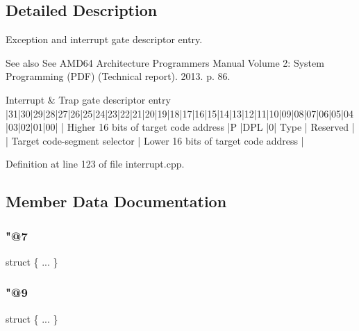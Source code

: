 \subsection{Detailed Description}
Exception and interrupt gate descriptor entry. 

\begin{DoxySeeAlso}{See also}
See A\+M\+D64 Architecture Programmer\textquotesingle{}s Manual Volume 2\+: System Programming (P\+DF) (Technical report). 2013. p. 86.
\end{DoxySeeAlso}
\begin{DoxyVerb}Interrupt & Trap gate descriptor entry
|31|30|29|28|27|26|25|24|23|22|21|20|19|18|17|16|15|14|13|12|11|10|09|08|07|06|05|04|03|02|01|00|
| Higher 16 bits of target code address         |P |DPL  |0|    Type    | Reserved              |
| Target code-segment selector                  | Lower 16 bits of target code address          |
\end{DoxyVerb}
 

Definition at line 123 of file interrupt.\+cpp.



\subsection{Member Data Documentation}
\mbox{\label{union_i_n_t_r_p_1_1_descriptor_entry_a2af38a2e445b1edbf0e8da359aca6f42}} 
\subsubsection{\texorpdfstring{"@7}{@7}}
{\footnotesize\ttfamily struct \{ ... \} }

\mbox{\label{union_i_n_t_r_p_1_1_descriptor_entry_a34bf9380c25f30b00b541e4f4447abe8}} 
\subsubsection{\texorpdfstring{"@9}{@9}}
{\footnotesize\ttfamily struct \{ ... \} }

\mbox{\label{union_i_n_t_r_p_1_1_descriptor_entry_a479e62ef6f3e27e03e121d965d6bab99}} 
